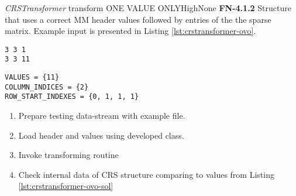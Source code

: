 \begin{testcase}{\emph{CRSTransformer} transform ONE VALUE ONLY}{High}{None}
	{
		\textbf{FN-4.1.2}
	}
	{
		Structure that uses a correct \gls{MM} header values followed by entries of the the sparse matrix. Example input is presented in Listing \ref{lst:crstransformer-ovo}. 	
	}
	\begin{lstlisting}[label={lst:crstransformer-ovo},
	basicstyle=\small,caption={\gls{MM} format data example}, frame=single]
	%%MatrixMarket matrix coordinate real general
3 3 1
3 3 11
	\end{lstlisting}
	\begin{lstlisting}[label={lst:crstransformer-ovo-sol},
	basicstyle=\small,caption={\gls{CRS} format internal data example}, frame=single]
VALUES = {11}
COLUMN_INDICES = {2}
ROW_START_INDEXES = {0, 1, 1, 1}
	\end{lstlisting}
	{
		\begin{enumerate}
			\item Prepare testing data-stream with example file.
			\item Load header and values using developed class.
			\item Invoke transforming routine 
			\item
			{
				Check internal data of \gls{CRS} structure comparing to values from Listing \ref{lst:crstransformer-ovo-sol} 
			}
		\end{enumerate}
	}
\end{testcase}

